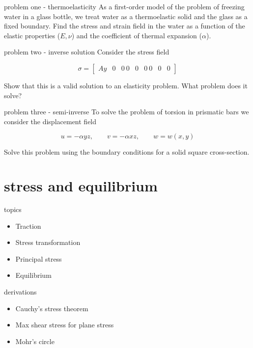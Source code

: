 \documentclass[
  letterpaper,
  ignorenonframetext,
  aspectratio=43,
  handout,
  12pt]{beamer}
\providecommand{\tightlist}{%
  \setlength{\itemsep}{0pt}\setlength{\parskip}{0pt}}
\providecommand{\tightlist}{%
\setlength{\itemsep}{0pt}\setlength{\parskip}{0pt}}
\begin{document}
\begin{frame}{problem one - thermoelasticity}
\protect\hypertarget{problem-one---thermoelasticity}{}
As a first-order model of the problem of freezing water in a glass
bottle, we treat water as a thermoelastic solid and the glass as a fixed
boundary. Find the stress and strain field in the water as a function of
the elastic properties (\(E,\nu\)) and the coefficient of thermal
expansion (\(\alpha\)).
\end{frame}

\begin{frame}{problem two - inverse solution}
\protect\hypertarget{problem-two---inverse-solution}{}
Consider the stress field

\[ \sigma = \begin{bmatrix} Ay & 0 & 0 \ 0 & 0 & 0 \ 0 & 0 & 0 \end{bmatrix}  \]

Show that this is a valid solution to an elasticity problem. What
problem does it solve?
\end{frame}

\begin{frame}{problem three - semi-inverse}
\protect\hypertarget{problem-three---semi-inverse}{}
To solve the problem of torsion in prismatic bars we consider the
displacement field

\[ u = -\alpha y z, \qquad v = -\alpha x z, \qquad w = w(x,y) \]

Solve this problem using the boundary conditions for a solid square
cross-section.
\end{frame}

\hypertarget{stress-and-equilibrium}{%
\section{stress and equilibrium}\label{stress-and-equilibrium}}

\begin{frame}{topics}
\protect\hypertarget{topics}{}
\begin{itemize}
\tightlist
\item
  Traction
\item
  Stress transformation
\item
  Principal stress
\item
  Equilibrium
\end{itemize}
\end{frame}

\begin{frame}{derivations}
\protect\hypertarget{derivations}{}
\begin{itemize}
\tightlist
\item
  Cauchy's stress theorem
\item
  Max shear stress for plane stress
\item
  Mohr's circle
\end{itemize}
\end{frame}
\end{document}

